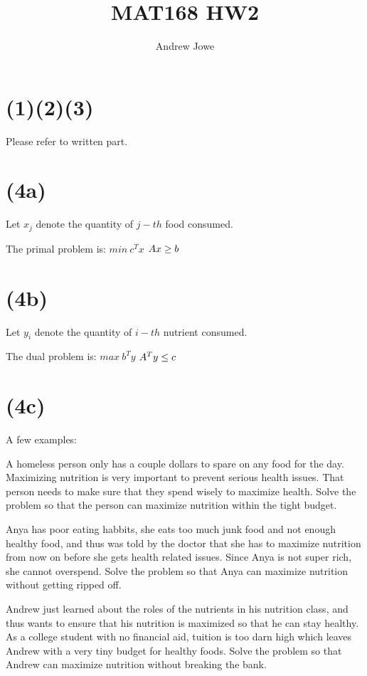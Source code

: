 \documentclass[17pt]{extarticle}
\title{MAT168 HW2}
\author{Andrew Jowe}
\begin{document}
\maketitle
\section*{(1)(2)(3)}
Please refer to written part.

\section*{(4a)}
Let $x_j$ denote the quantity of $j-th$ food consumed.

\bigskip The primal problem is:
$min \ c^Tx$
$\\Ax \geq b$

\section*{(4b)}
Let $y_i$ denote the quantity of $i-th$ nutrient consumed.

The dual problem is:
$max \ b^Ty$
$\\A^Ty \leq c$

\section*{(4c)}
A few examples:

\bigskip A homeless person only has a couple dollars to spare on any food for the day. Maximizing nutrition is very important to prevent serious health issues. That person needs to make sure that they spend wisely to maximize health. Solve the problem so that the person can maximize nutrition within the tight budget.

\bigskip Anya has poor eating habbits, she eats too much junk food and not enough healthy food, and thus was told by the doctor that she has to maximize nutrition from now on before she gets health related issues. Since Anya is not super rich, she cannot overspend. Solve the problem so that Anya can maximize nutrition without getting ripped off.

\bigskip Andrew just learned about the roles of the nutrients in his nutrition class, and thus wants to ensure that his nutrition is maximized so that he can stay healthy. As a college student with no financial aid, tuition is too darn high which leaves Andrew with a very tiny budget for healthy foods. Solve the problem so that Andrew can maximize nutrition without breaking the bank.
\end{document}
